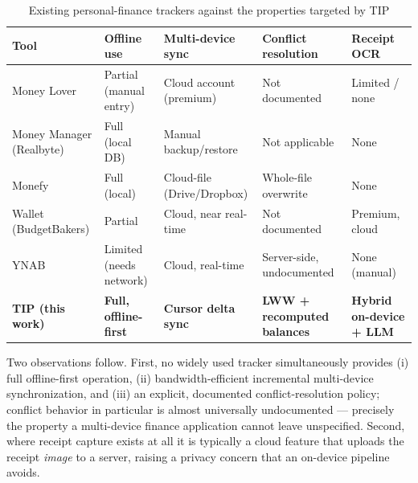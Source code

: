 \documentclass[13pt,a4paper]{extarticle}
\begin{document}
\begin{table}[H]
\centering
\caption{Existing personal-finance trackers against the properties targeted by TIP}
\label{tab:related}
\renewcommand{\arraystretch}{1.25}
\small
\begin{tabularx}{\textwidth}{@{}p{2.6cm} X X X X@{}}
\toprule
\textbf{Tool} & \textbf{Offline use} & \textbf{Multi-device sync} & \textbf{Conflict resolution} & \textbf{Receipt OCR} \\
\midrule
Money Lover              & Partial (manual entry) & Cloud account (premium)  & Not documented            & Limited / none \\
Money Manager (Realbyte) & Full (local DB)        & Manual backup/restore    & Not applicable            & None \\
Monefy                   & Full (local)           & Cloud-file (Drive/Dropbox) & Whole-file overwrite     & None \\
Wallet (BudgetBakers)    & Partial                & Cloud, near real-time    & Not documented            & Premium, cloud \\
YNAB                     & Limited (needs network) & Cloud, real-time        & Server-side, undocumented & None (manual) \\
\textbf{TIP (this work)} & \textbf{Full, offline-first} & \textbf{Cursor delta sync} & \textbf{LWW + recomputed balances} & \textbf{Hybrid on-device + LLM} \\
\bottomrule
\end{tabularx}
\end{table}

Two observations follow. First, no widely used tracker simultaneously provides (i) full offline-first
operation, (ii) bandwidth-efficient incremental multi-device synchronization, and (iii) an explicit,
documented conflict-resolution policy; conflict behavior in particular is almost universally
undocumented --- precisely the property a multi-device finance application cannot leave unspecified.
Second, where receipt capture exists at all it is typically a cloud feature that uploads the receipt
\textit{image} to a server, raising a privacy concern that an on-device pipeline avoids.
\end{document}
